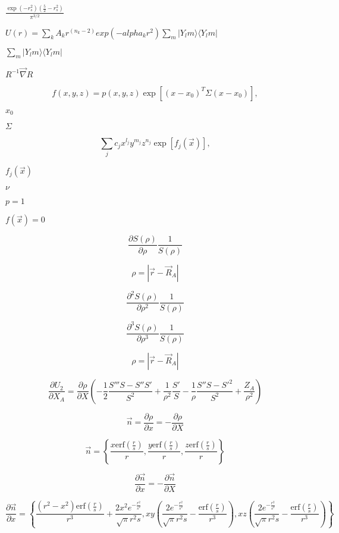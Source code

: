 \documentclass{article}
\begin{document}
$ \frac{\exp(-r_s^2) \left(\frac{5}{2}- r_s^2 \right)}{\pi^{3/2}} $
\pagebreak

$  U(r) = \sum_k A_k r^(n_k-2) exp(-alpha_k r^2) \sum_m |Y_lm \rangle \langle Y_lm| $
\pagebreak

$\sum_m |Y_lm \rangle \langle Y_lm|$
\pagebreak

$R^{-1} \vec\nabla R$
\pagebreak

\[
f(x,y,z) = p(x,y,z) \exp[(x-x_0)^T \Sigma (x-x_0)],
\]
\pagebreak

$x_0$
\pagebreak

$\Sigma$
\pagebreak

\[
\sum_j c_j x^{l_j} y^{m_j} z^{n_j} \exp[f_j(\vec{x})],
\]
\pagebreak

$f_j(\vec{x})$
\pagebreak

$\nu$
\pagebreak

$p=1$
\pagebreak

$f(\vec{x})=0$
\pagebreak

\[
    \frac{\partial S(\rho)}{\partial \rho} \frac{1}{S(\rho)}
\]
\pagebreak

\[
   \rho = |\vec r - \vec R_A |
\]
\pagebreak

\[
    \frac{\partial^2 S(\rho)}{\partial \rho^2} \frac{1}{S(\rho)}
\]
\pagebreak

\[
    \frac{\partial^3 S(\rho)}{\partial \rho^3} \frac{1}{S(\rho)}
\]
\pagebreak

\[
  \rho = \left| \vec r- \vec R_A \right|
\]
\pagebreak

\[
\frac{\partial U_2}{\partial X_A} = \frac{\partial \rho}{\partial X}
          \left(-\frac{1}{2}\frac{S''' S - S'' S'}{S^2} + \frac{1}{\rho^2}\frac{S'}{S}
          - \frac{1}{\rho} \frac{S''S - S'^2}{S^2} + \frac{Z_A}{\rho^2}\right)
\]
\pagebreak

\[
    \vec n  = \frac{\partial \rho}{\partial x} = -\frac{\partial \rho}{\partial X}
\]
\pagebreak

\[
\vec n = \left\{\frac{x \mathrm{erf}\left(\frac{r}{s}\right)}{r},
         \frac{y \mathrm{erf}\left(\frac{r}{s}\right)}{r},
         \frac{z \mathrm{erf}\left(\frac{r}{s}\right)}{r}\right\}
\]
\pagebreak

\[
    \frac{\partial \vec n}{\partial x}  = -\frac{\partial \vec n}{\partial X}
\]
\pagebreak

\[
\frac{\partial\vec n}{\partial x} =
\left\{\frac{\left(r^2-x^2\right) \mathrm{erf}\left(\frac{r}{s}\right)}{r^3}
   +\frac{2 x^2 e^{-\frac{r^2}{s^2}}}{\sqrt{\pi } r^2 s},
 x y \left(\frac{2 e^{-\frac{r^2}{s^2}}}{\sqrt{\pi } r^2 s}
   -\frac{\mathrm{erf}\left(\frac{r}{s}\right)}{r^3}\right),
 x z \left(\frac{2 e^{-\frac{r^2}{s^2}}}{\sqrt{\pi } r^2 s}
   -\frac{\mathrm{erf}\left(\frac{r}{s}\right)}{r^3}\right)\right\}
\]
\pagebreak
\end{document}
